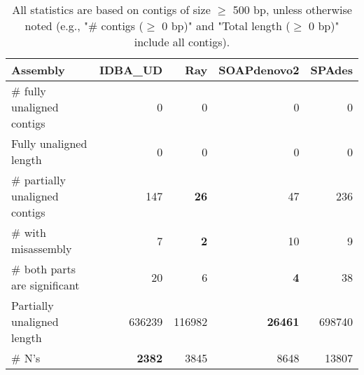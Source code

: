 \documentclass[12pt,a4paper]{article}
\begin{document}
\begin{table}[ht]
\begin{center}
\caption{All statistics are based on contigs of size $\geq$ 500 bp, unless otherwise noted (e.g., "\# contigs ($\geq$ 0 bp)" and "Total length ($\geq$ 0 bp)" include all contigs).}
\begin{tabular}{|l*{4}{|r}|}
\hline
Assembly & IDBA\_UD & Ray & SOAPdenovo2 & SPAdes \\ \hline
\# fully unaligned contigs & 0 & 0 & 0 & 0 \\ \hline
Fully unaligned length & 0 & 0 & 0 & 0 \\ \hline
\# partially unaligned contigs & 147 & {\bf 26} & 47 & 236 \\ \hline
\hspace{5mm}\# with misassembly & 7 & {\bf 2} & 10 & 9 \\ \hline
\hspace{5mm}\# both parts are significant & 20 & 6 & {\bf 4} & 38 \\ \hline
Partially unaligned length & 636239 & 116982 & {\bf 26461} & 698740 \\ \hline
\# N's & {\bf 2382} & 3845 & 8648 & 13807 \\ \hline
\end{tabular}
\end{center}
\end{table}
\end{document}
